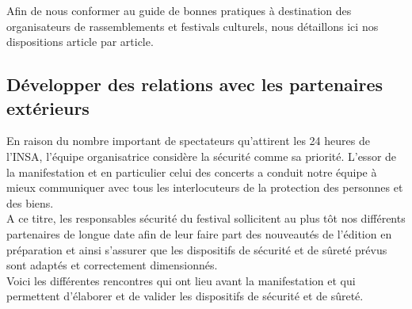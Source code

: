 \documentclass[hidelinks, paper=a4, fontsize=13pt]{report}
\begin{document}
Afin de nous conformer au guide de bonnes pratiques à destination des organisateurs de rassemblements et festivals culturels, nous détaillons ici nos dispositions article par article.

\subsection{Développer des relations avec les partenaires extérieurs}

En raison du nombre important de spectateurs qu'attirent les 24 heures de l'INSA, l'équipe organisatrice considère la sécurité comme sa priorité. L'essor de la manifestation et en particulier celui des concerts a conduit notre équipe à mieux communiquer avec tous les interlocuteurs de la protection des personnes et des biens.\\

A ce titre, les responsables sécurité du festival sollicitent au plus tôt nos différents partenaires de longue date afin de leur faire part des nouveautés de l’édition en préparation et ainsi s’assurer que les dispositifs de sécurité et de sûreté prévus sont adaptés et correctement dimensionnés.\\

Voici les différentes rencontres qui ont lieu avant la manifestation et qui permettent d'élaborer et de valider les dispositifs de sécurité et de sûreté.\\
\end{document}
